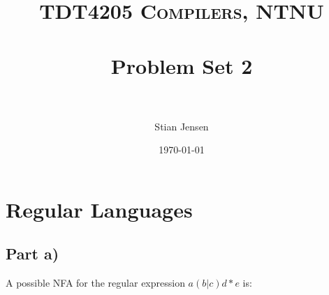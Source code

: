 \documentclass[paper=a4, fontsize=11pt]{scrartcl} %
\title{ 
\normalfont \normalsize 
\textsc{TDT4205 Compilers, NTNU} \\ [25pt] %
\horrule{0.5pt} \\[0.4cm] %
\huge Problem Set 2 \\ %
\horrule{2pt} \\[0.5cm] %
}
\author{Stian Jensen} %
\date{\normalsize\today} %
\numberwithin{equation}{section} %
\numberwithin{figure}{section} %
\numberwithin{table}{section} %
\begin{document}
\maketitle %


\section{Regular Languages}

\subsection{Part a)}
A possible NFA for the regular expression $a(b|c)d*e$ is:
\end{document}
